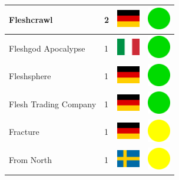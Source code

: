 \documentclass[12pt, a4paper, twoside]{report}
\begin{document}
\begin{center}
\begin{longtable}{|p{5cm}|p{2cm}|p{2cm}|p{2cm}|}
			Fleshcrawl & 2 & \includegraphics[width=1cm]{4x3/de} & \includegraphics[width=1cm]{likes/y} \\ \hline
			Fleshgod Apocalypse & 1 & \includegraphics[width=1cm]{4x3/it} & \includegraphics[width=1cm]{likes/y} \\ \hline
			Fleshsphere & 1 & \includegraphics[width=1cm]{4x3/de} & \includegraphics[width=1cm]{likes/y} \\ \hline
			Flesh Trading Company & 1 & \includegraphics[width=1cm]{4x3/de} & \includegraphics[width=1cm]{likes/y} \\ \hline
			Fracture & 1 & \includegraphics[width=1cm]{4x3/de} & \includegraphics[width=1cm]{likes/m} \\ \hline
			From North & 1 & \includegraphics[width=1cm]{4x3/se} & \includegraphics[width=1cm]{likes/m} \\ \hline

\end{longtable}
\end{center}
\end{document}
